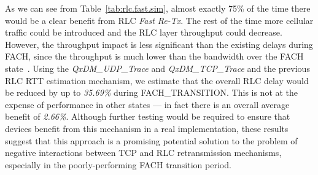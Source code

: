 As we can see from Table~\ref{tab:rlc.fast.sim}, almost exactly 75\% of the time there would be a clear benefit from RLC \emph{Fast Re-Tx}. The rest of the time more cellular traffic could be introduced and the RLC layer throughput could decrease. However, the throughput impact is less significant than the existing delays during FACH, since the throughput is much lower than the bandwidth over the FACH state~\cite{3g_rrc}. Using the \emph{QxDM\_{}UDP\_{}Trace} and \emph{QxDM\_{}TCP\_{}Trace} and the previous RLC RTT estimation mechanism, we estimate that the overall RLC delay would be reduced by up to \textit{35.69\%} during FACH\_{}TRANSITION. This is not at the expense of performance in other states --- in fact there is an overall average benefit of \textit{2.66\%}. Although further testing would be required to ensure that devices benefit from this mechanism in a real implementation, these results suggest that this approach is a promising potential solution to the problem of negative interactions between TCP and RLC retransmission mechanisms, especially in the poorly-performing FACH transition period.


